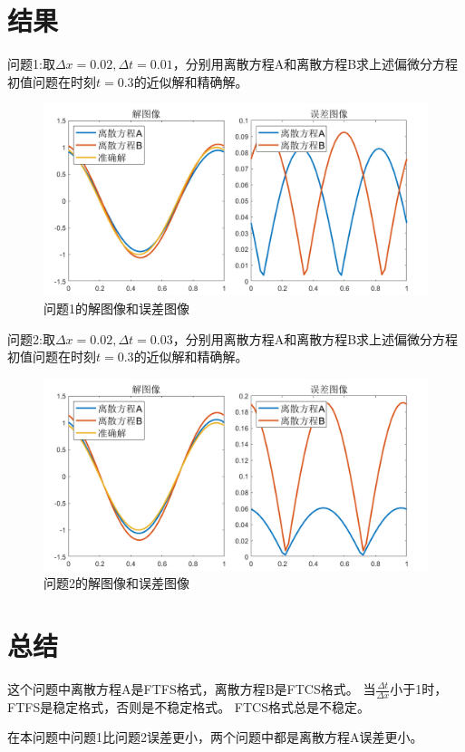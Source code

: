 \documentclass{article}
\begin{document}
\section{结果}
问题1:取$\Delta x=0.02, \Delta t=0.01$，分别用离散方程A和离散方程B求上述偏微分方程初值问题在时刻$t=0.3$的近似解和精确解。\par
\begin{figure}[htbp]
    \centering
    \caption{问题1的解图像和误差图像}
    \includegraphics[width=\textwidth]{问题1.png}
\end{figure}
问题2:取$\Delta x=0.02, \Delta t=0.03$，分别用离散方程A和离散方程B求上述偏微分方程初值问题在时刻$t=0.3$的近似解和精确解。\par
\begin{figure}[htbp]
    \centering
    \caption{问题2的解图像和误差图像}
    \includegraphics[width=\textwidth]{问题2.png}
\end{figure}

\section{总结}
这个问题中离散方程A是FTFS格式，离散方程B是FTCS格式。
当$\frac{\Delta t}{\Delta x}$小于1时，FTFS是稳定格式，否则是不稳定格式。
FTCS格式总是不稳定。\par
在本问题中问题1比问题2误差更小，两个问题中都是离散方程A误差更小。
\end{document}

